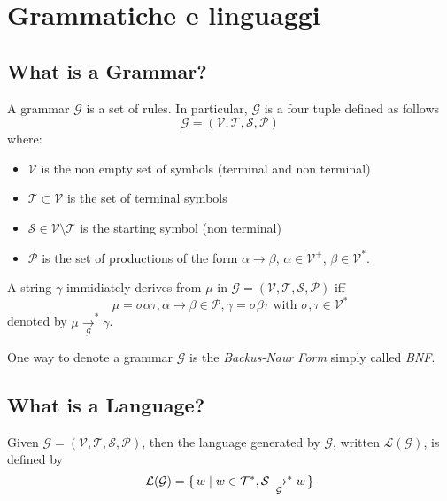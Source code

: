 \chapter{Grammatiche e linguaggi}

\section{What is a Grammar?}

A grammar $\mathcal{G}$ is a set of rules. In particular, $\mathcal{G}$ is a four tuple defined as follows
\begin{equation}
\mathcal{G} = (\mathcal{V}, \mathcal{T}, \mathcal{S}, \mathcal{P})
\end{equation}
where:
\begin{itemize}
\item $\mathcal{V}$ is the non empty set of symbols (terminal and non terminal)
\item $\mathcal{T} \subset \mathcal{V}$ is the set of terminal symbols
\item $\mathcal{S} \in \mathcal{V} \setminus \mathcal{T}$ is the starting symbol (non terminal)
\item $\mathcal{P}$ is the set of productions of the form $\alpha \rightarrow \beta$, $\alpha \in \mathcal{V}^+$, $\beta \in \mathcal{V}^*$.
\end{itemize}
\noindent
A string $\gamma$ immidiately derives from $\mu$ in $\mathcal{G} = (\mathcal{V}, \mathcal{T}, \mathcal{S}, \mathcal{P})$ iff
\begin{equation}
\mu = \sigma \alpha \tau, \alpha \rightarrow \beta \in \mathcal{P}, \gamma = \sigma \beta \tau \text{ with } \sigma,\tau \in \mathcal{V}^*
\end{equation}
denoted by $\mu \xrightarrow[\mathcal{G}]{}^* \gamma$.

\noindent
One way to denote a grammar $\mathcal{G}$ is the \textit{Backus-Naur Form} simply called \textit{BNF}.


\section{What is a Language?}
Given $\mathcal{G} = (\mathcal{V}, \mathcal{T}, \mathcal{S}, \mathcal{P})$, then the language generated by $\mathcal{G}$, written $\mathcal{L(G)}$, is defined by
\[
\mathcal{L(G)} = \set{ w | w \in \mathcal{T}^*, \mathcal{S} \xrightarrow[\mathcal{G}]{}^* w }
\]

